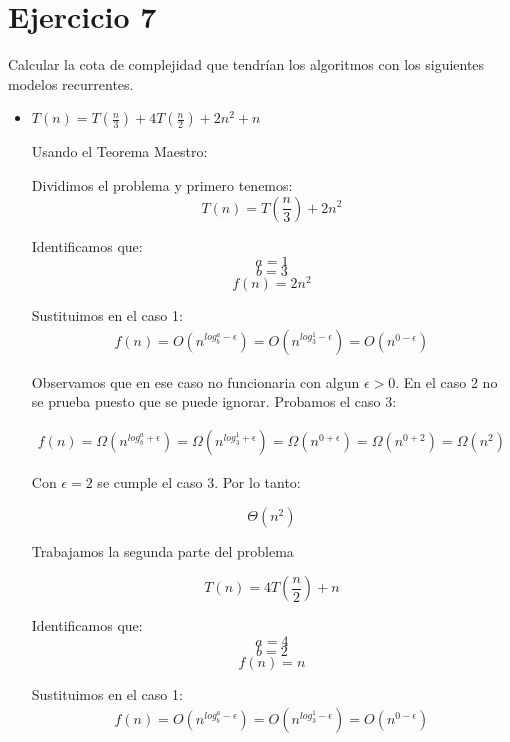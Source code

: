 \documentclass[12pt]{article}
\begin{document}
  \section{Ejercicio 7}
    Calcular la cota de complejidad que tendrían los algoritmos con los siguientes modelos recurrentes.

    \begin{itemize}
      \item $ T(n) = T(\frac{n}{3}) + 4T(\frac{n}{2}) + 2n^{2} + n $
        
        Usando el Teorema Maestro:

        Dividimos el problema y primero tenemos:
        $$ T(n) = T(\frac{n}{3}) + 2n^{2} $$

        Identificamos que:
        $$ a = 1 $$
        $$ b = 3 $$
        $$ f(n) = 2n^{2} $$ 

        Sustituimos en el caso 1:
        \begin{equation*}
          \begin{split}
            f(n) = O( n^{log_{b}^{a}-\epsilon}) = O( n^{log_{3}^{1}-\epsilon}) = O( n^{0-\epsilon})
          \end{split}
        \end{equation*}

        Observamos que en ese caso no funcionaria con algun $\epsilon > 0$. En el caso 2 no se prueba puesto que se puede ignorar. Probamos el caso 3:
        
        \begin{equation*}
          \begin{split}
            f(n) = \Omega( n^{log_{b}^{a} + \epsilon}) = \Omega( n^{log_{3}^{1} + \epsilon}) = \Omega( n^{0 + \epsilon}) = \Omega( n^{0 + 2}) = \Omega( n^{2}) 
          \end{split}
        \end{equation*}

        Con $\epsilon = 2$ se cumple el caso 3. Por lo tanto:

        $$ \Theta\left( n^{2} \right) $$


        Trabajamos la segunda parte del problema

        $$ T(n) = 4T(\frac{n}{2}) + n $$

        Identificamos que:
        $$ a = 4 $$
        $$ b = 2 $$
        $$ f(n) = n $$ 

        Sustituimos en el caso 1:
        \begin{equation*}
          \begin{split}
            f(n) = O( n^{log_{b}^{a}-\epsilon}) = O( n^{log_{3}^{1}-\epsilon}) = O( n^{0-\epsilon})
          \end{split}
        \end{equation*}


\end{itemize}
\end{document}
